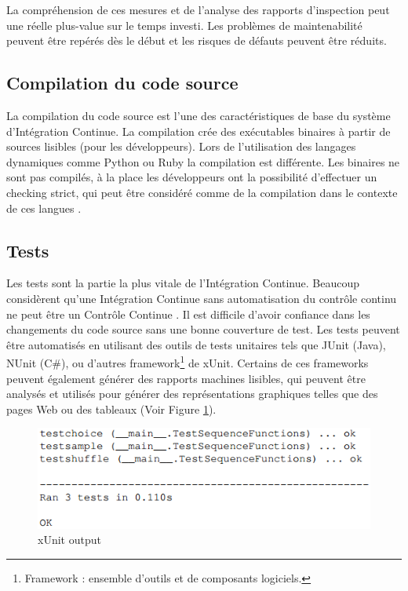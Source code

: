       La compréhension de ces mesures et de l'analyse des rapports d'inspection peut une réelle plus-value sur le temps investi. Les problèmes de maintenabilité peuvent être repérés dès le début et les risques de défauts peuvent être réduits.

    \subsection{Compilation du code source}
    La compilation du code source est l'une des caractéristiques de base du système d’Intégration Continue. La compilation crée des exécutables binaires à partir de sources lisibles (pour les développeurs). Lors de l'utilisation des langages dynamiques comme Python ou Ruby la compilation est différente. Les binaires ne sont pas compilés, à la place les développeurs ont la possibilité d'effectuer un checking strict, qui peut être considéré comme de la compilation dans le contexte de ces langues \cite{Duv07}.

    \subsection{Tests}
    Les tests sont la partie la plus vitale de l’Intégration Continue. Beaucoup considèrent qu’une Intégration Continue sans automatisation du contrôle continu ne peut être un Contrôle Continue \cite{Duv07}. Il est difficile d'avoir confiance dans les changements du code source sans une bonne couverture de test. Les tests peuvent être automatisés en utilisant des outils de tests unitaires tels que JUnit (Java), NUnit (C\#), ou d'autres framework\footnote{Framework : ensemble d'outils et de composants logiciels.} de xUnit. Certains de ces frameworks peuvent également générer des rapports machines lisibles, qui peuvent être analysés et utilisés pour générer des représentations graphiques telles que des pages Web ou des tableaux (Voir Figure \ref{xUnit output}).

    \begin{figure}
      \begin{center}
        \includegraphics[scale=0.8]{images/tests.png}
      \end{center}
      \caption{xUnit output}
      \label{xUnit output}
    \end{figure}

